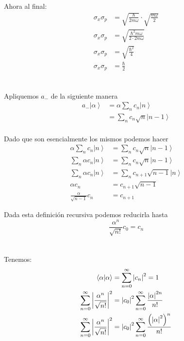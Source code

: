 \documentclass{report}
\newcommand{\inangle}[1]{\langle#1\rangle}
\begin{document}
Ahora al final:
\begin{align*}
  \sigma_x\sigma_p &= \sqrt{\frac{\hbar}{2m\omega}} \cdot \sqrt{\frac{m\omega}{2}}\\
  \sigma_x\sigma_p &= \sqrt{\frac{\hbar^2 m\omega}{2\cdot2m\omega}}\\
  \sigma_x\sigma_p &= \sqrt{\frac{\hbar^2}{4}}\\
  \sigma_x\sigma_p &= \frac{\hbar}{2}
\end{align*}

\pagebreak

\section{}

Apliquemos $a_-$ de la siguiente manera
\begin{align*}
  a_-\left| \alpha \right> &= \alpha \sum_{n} c_n \left| n \right>\\
  &= \sum_{n} c_n \sqrt{n} \left| n - 1 \right>\\
\end{align*}

Dado que son esencialmente los mismos podemos hacer
\begin{align*}
  \alpha \sum_{n} c_n \left| n \right> &= \sum_{n} c_n \sqrt{n} \left| n - 1 \right>\\
  \sum_{n} \alpha c_n \left| n \right> &= \sum_{n} c_n \sqrt{n} \left| n - 1 \right>\\
  \sum_{n} \alpha c_n \left| n \right> &= \sum_{n} c_{n + 1} \sqrt{n - 1} \left| n \right>\\
  \alpha c_n &= c_{n + 1} \sqrt{n - 1}\\
  \frac{\alpha}{\sqrt{n - 1}} c_n &= c_{n + 1}
\end{align*}

Dada esta definición recursiva podemos reducirla hasta
\[
  \frac{\alpha^n}{\sqrt{n!}} c_0 = c_{n}
\]

\section{}

Tenemos:
\begin{align*}
  \inangle{\alpha | \alpha} &= \sum_{n = 0}^{\infty} \left|c_n\right|^2 = 1\\
  \sum_{n = 0}^{\infty} \left|\frac{\alpha^n}{\sqrt{n!}}\right|^2 &= \left|c_0\right|^2 \sum_{n = 0}^{\infty} \frac{\left|\alpha\right|^{2n}}{n!}\\
  \sum_{n = 0}^{\infty} \left|\frac{\alpha^n}{\sqrt{n!}}\right|^2 &= \left|c_0\right|^2 \sum_{n = 0}^{\infty} \frac{\paren{\left|\alpha\right|^{2}}^n}{n!}
\end{align*}
\end{document}
